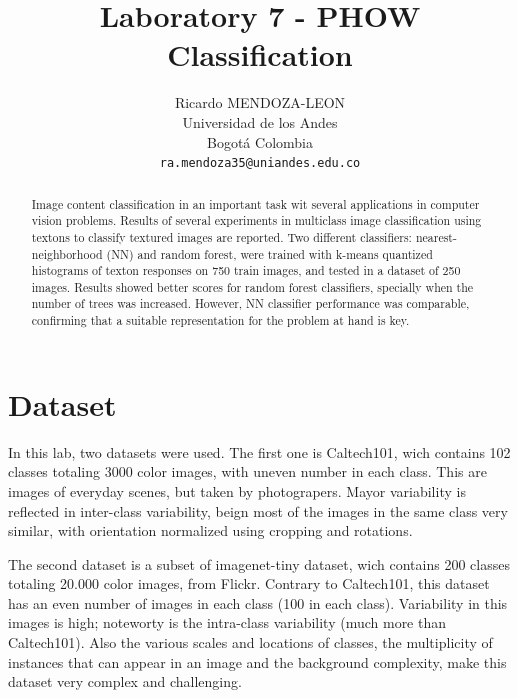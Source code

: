 \documentclass[10pt,two column,letter paper]{article}
\begin{document}
\title{Laboratory 7 - PHOW Classification}

\author{Ricardo MENDOZA-LEON\\
Universidad de los Andes\\
Bogot\'{a} Colombia\\
{\tt\small ra.mendoza35@uniandes.edu.co}
}

\maketitle

\begin{abstract}
Image content classification in an important task wit several applications in computer vision 
problems. Results of several experiments in multiclass image classification using textons 
to classify textured images are reported. Two different classifiers: nearest-neighborhood (NN) 
and random forest, were trained with k-means quantized histograms of texton responses on 750
train images, and tested in a dataset of 250 images. Results showed better scores for 
random forest classifiers, specially when the number of trees was increased.
However, NN classifier performance was comparable, confirming that a suitable representation
for the problem at hand is key.
\end{abstract}

\section{Dataset}
In this lab, two datasets were used. The first one is Caltech101, wich contains 102 classes
totaling 3000 color images, with uneven number in each class. This are images of everyday
scenes, but taken by photograpers. Mayor variability is reflected in inter-class variability, 
beign most of the images in the same class very similar, with orientation normalized using
cropping and rotations.

The second dataset is a subset of imagenet-tiny dataset, wich contains 200 classes totaling 20.000 
color images, from Flickr. Contrary to Caltech101, this dataset has an even number of images
in each class (100 in each class). Variability in this images is high; noteworty is the
intra-class variability (much more than Caltech101). Also the various scales and locations
of classes, the multiplicity of instances that can appear in an image and the background
complexity, make this dataset very complex and challenging.
\end{document}
